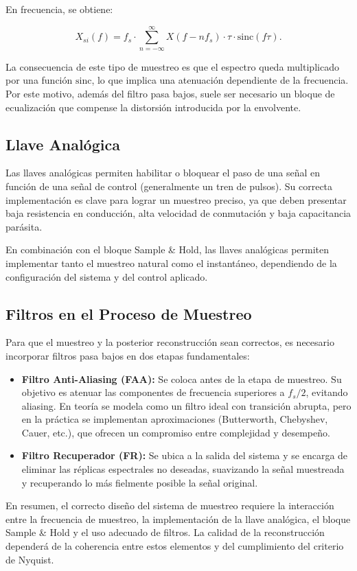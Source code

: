 En frecuencia, se obtiene:

\begin{equation}
    X_{si}(f) = f_s \cdot \sum_{n=-\infty}^{\infty} X(f-nf_s) \cdot \tau \cdot \text{sinc}(f\tau).
\end{equation}

La consecuencia de este tipo de muestreo es que el espectro queda multiplicado por una función $\text{sinc}$, lo que implica una atenuación dependiente de la frecuencia. Por este motivo, además del filtro pasa bajos, suele ser necesario un bloque de ecualización que compense la distorsión introducida por la envolvente.

\subsection{Llave Analógica}
Las llaves analógicas permiten habilitar o bloquear el paso de una señal en función de una señal de control (generalmente un tren de pulsos). Su correcta implementación es clave para lograr un muestreo preciso, ya que deben presentar baja resistencia en conducción, alta velocidad de conmutación y baja capacitancia parásita.

En combinación con el bloque Sample \& Hold, las llaves analógicas permiten implementar tanto el muestreo natural como el instantáneo, dependiendo de la configuración del sistema y del control aplicado.

\subsection{Filtros en el Proceso de Muestreo}
Para que el muestreo y la posterior reconstrucción sean correctos, es necesario incorporar filtros pasa bajos en dos etapas fundamentales:

\begin{itemize}
    \item \textbf{Filtro Anti-Aliasing (FAA):} Se coloca antes de la etapa de muestreo. Su objetivo es atenuar las componentes de frecuencia superiores a $f_s/2$, evitando aliasing. En teoría se modela como un filtro ideal con transición abrupta, pero en la práctica se implementan aproximaciones (Butterworth, Chebyshev, Cauer, etc.), que ofrecen un compromiso entre complejidad y desempeño.
    
    \item \textbf{Filtro Recuperador (FR):} Se ubica a la salida del sistema y se encarga de eliminar las réplicas espectrales no deseadas, suavizando la señal muestreada y recuperando lo más fielmente posible la señal original.
\end{itemize}

En resumen, el correcto diseño del sistema de muestreo requiere la interacción entre la frecuencia de muestreo, la implementación de la llave analógica, el bloque Sample \& Hold y el uso adecuado de filtros. La calidad de la reconstrucción dependerá de la coherencia entre estos elementos y del cumplimiento del criterio de Nyquist.
